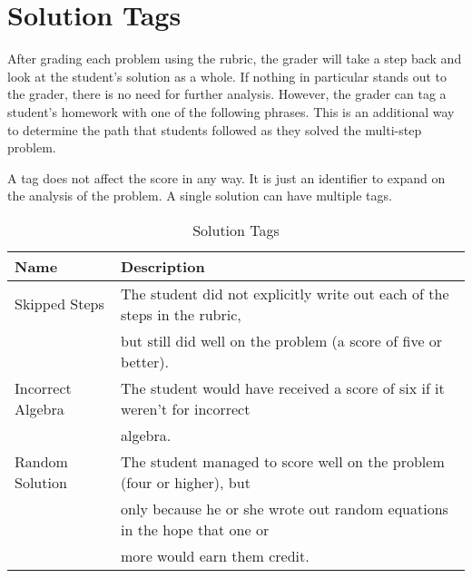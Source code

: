 \section{Solution Tags}

After grading each problem using the rubric, the grader will take a step back and look at the student's solution as a whole. If nothing in particular stands out to the grader, there is no need for further analysis. However, the grader can tag a student's homework with one of the following phrases. This is an additional way to determine the path that students followed as they solved the multi-step problem.

A tag does not affect the score in any way. It is just an identifier to expand on the analysis of the problem. A single solution can have multiple tags.

\pagebreak

\begin{landscape}
\begin{table}[!ht]
  \centering
  \begin{tabular}{|l|l|}
    \hline
    \textbf{Name} & \textbf{Description}\\
	\hline
	Skipped Steps & The student did not explicitly write out each of the steps in the rubric,\\
	& but still did well on the problem (a score of five or better).\\
	\hline
	Incorrect Algebra & The student would have received a score of six if it weren't for incorrect\\
	& algebra.\\
	\hline
	Random Solution & The student managed to score well on the problem (four or higher), but\\
	& only because he or she wrote out random equations in the hope that one or\\
	& more would earn them credit.\\
	\hline
  \end{tabular}
  \caption{Solution Tags}
  \label{tab:solution-tags}
\end{table}
\end{landscape}


